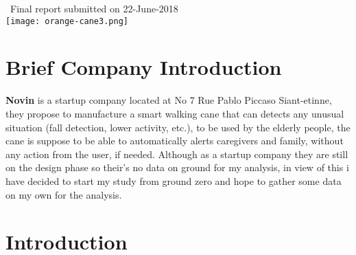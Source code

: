 \documentclass[a4paper, parskip=full]{scrartcl}
\begin{document}
\begin{titlepage}
	
	
	{\large \ Final report submitted on 22-June-2018}\\[0.2cm] %
	
	
	\texttt{[image: orange-cane3.png]}\\[0.2cm] %
	
	
	\vfill %
	
\end{titlepage}





\section*{Brief Company Introduction}
\textbf{Novin} is a startup company located at No 7 Rue Pablo Piccaso Siant-etinne, they propose to manufacture a smart walking cane that can detects any unusual situation (fall detection, lower activity, etc.), to be used by the elderly people, the cane is suppose to be able to automatically alerts caregivers and family, without any action from the user, if needed. Although as a startup company they are still on the design phase so their's no data on ground for my analysis, in view of this i have decided to start my study from ground zero and hope to gather some data on my own for the analysis.

 \section*{Introduction}
 
\end{document}
